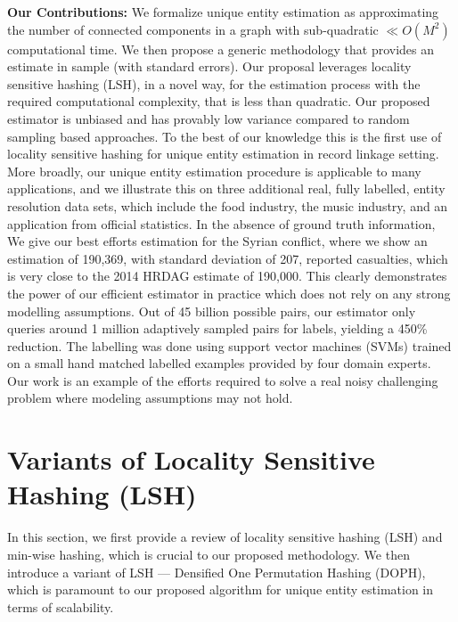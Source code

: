 \documentclass[aoas]{imsart}
\begin{document}
{\bf Our Contributions:} We formalize unique entity estimation as approximating the number of connected components in a graph with sub-quadratic $\ll O(M^2)$ computational time. We then propose a generic methodology that provides an estimate in sample (with standard errors). Our proposal leverages locality sensitive hashing (LSH), in a novel way, for the estimation process with the required computational complexity, that is less than quadratic. Our proposed estimator is unbiased and has provably low variance compared to random sampling based approaches. To the best of our knowledge this is the first use of locality sensitive hashing for unique entity estimation in record linkage setting.
%
More broadly, our unique entity estimation procedure is applicable to many applications, and we illustrate this on three additional real, fully labelled, entity resolution data sets, which include the food industry, the music industry, and an application from official statistics. In the absence of ground truth information, We give our best efforts estimation for the Syrian conflict, where we show an estimation of 190,369, with standard deviation of 207, reported casualties, which is very close to the 2014 HRDAG estimate of 190,000. This clearly demonstrates the power of our efficient estimator in practice which does not rely on any strong modelling assumptions. Out of 45 billion possible pairs, our estimator only queries around 1 million adaptively sampled pairs for labels, yielding a 450\% reduction. The labelling was done using support vector machines (SVMs) trained on a small hand matched labelled examples provided by four domain experts. Our work is an example of the efforts required to solve a real noisy challenging problem where modeling assumptions may not hold.


\section{Variants of Locality Sensitive Hashing (LSH)}
\label{sec:lsh}
In this section, we first provide a review of locality sensitive hashing (LSH) and min-wise hashing, which is crucial to our proposed methodology. We then introduce a variant of LSH --- Densified One Permutation Hashing (DOPH), which is paramount to our proposed algorithm for unique entity estimation in terms of scalability.
\end{document}
